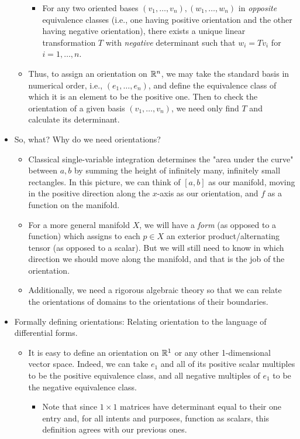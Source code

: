 \documentclass[../notes.tex]{subfiles}
\begin{document}
\begin{itemize}
\begin{itemize}
\begin{itemize}
            \item For any two oriented bases $(v_1,\dots,v_n),(w_1,\dots,w_n)$ in \emph{opposite} equivalence classes (i.e., one having positive orientation and the other having negative orientation), there exists a unique linear transformation $T$ with \emph{negative} determinant such that $w_i=Tv_i$ for $i=1,\dots,n$.
        \end{itemize}
        \item Thus, to assign an orientation on $\mathbb{R}^n$, we may take the standard basis in numerical order, i.e., $(e_1,\dots,e_n)$, and define the equivalence class of which it is an element to be the positive one. Then to check the orientation of a given basis $(v_1,\dots,v_n)$, we need only find $T$ and calculate its determinant.
    \end{itemize}
    \item So, what? Why do we need orientations?
    \begin{itemize}
        \item Classical single-variable integration determines the "area under the curve" between $a,b$ by summing the height of infinitely many, infinitely small rectangles. In this picture, we can think of $[a,b]$ as our manifold, moving in the positive direction along the $x$-axis as our orientation, and $f$ as a function on the manifold.
        \item For a more general manifold $X$, we will have a \emph{form} (as opposed to a function) which assigns to each $p\in X$ an exterior product/alternating tensor (as opposed to a scalar). But we will still need to know in which direction we should move along the manifold, and that is the job of the orientation.
        \item Additionally, we need a rigorous algebraic theory so that we can relate the orientations of domains to the orientations of their boundaries.
    \end{itemize}
    \item Formally defining orientations: Relating orientation to the language of differential forms.
    \begin{itemize}
        \item It is easy to define an orientation on $\mathbb{R}^1$ or any other 1-dimensional vector space. Indeed, we can take $e_1$ and all of its positive scalar multiples to be the positive equivalence class, and all negative multiples of $e_1$ to be the negative equivalence class.
        \begin{itemize}
            \item Note that since $1\times 1$ matrices have determinant equal to their one entry and, for all intents and purposes, function as scalars, this definition agrees with our previous ones.

\end{itemize}
\end{itemize}
\end{itemize}
\end{document}
